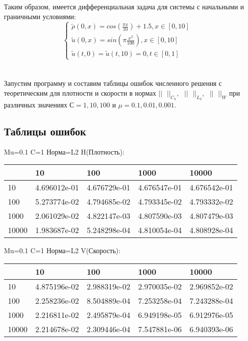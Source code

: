 \documentclass[a4paper, 12pt]{article}
\begin{document}
Таким образом,  имеется дифференциальная задача для системы с начальными и граничными условиями:
\begin{equation*}
 \begin{cases}
\widetilde{\rho}(0,x)=cos(\frac{\pi x}{10})+1.5, x \in [0,10]
\\
\widetilde {u}(0,x)=sin(\pi \frac{x^{2}}{100}), x \in [0,10]
\\
\widetilde {u}(t,0)=\widetilde {u}(t,10)=0, t \in [0,1]
 \end{cases}
\end{equation*}
\\ 
\\
Запустим программу и составим таблицы ошибок численного решения с теоретическим для плотности и скорости в нормах $||\text{ }||_{C_{h}},\text{ }||\text{ }||_{L_{2}},\text{ }||\text{ }||_{W}$ при  различных значениях   С$=1,10,100$ и $\mu=0.1,0.01,0.001$.
\\
\subsection{Таблицы ошибок}
Mu=0.1  C=1 Норма=L2 H(Плотность):


\begin{tabular}{lllll}
\toprule
{} &         10    &         100   &         1000  &         10000 \\
\midrule
10    &  4.696012e-01 &  4.676729e-01 &  4.676547e-01 &  4.676542e-01 \\
100   &  5.273774e-02 &  4.794685e-02 &  4.793345e-02 &  4.793332e-02 \\
1000  &  2.061029e-02 &  4.822147e-03 &  4.807590e-03 &  4.807479e-03 \\
10000 &  1.983687e-02 &  5.248298e-04 &  4.810054e-04 &  4.808928e-04 \\
\bottomrule
\end{tabular}



\bigskip
\bigskip
\bigskip


Mu=0.1  C=1 Норма=L2 V(Скорость):


\begin{tabular}{lllll}
\toprule
{} &         10    &         100   &         1000  &         10000 \\
\midrule
10    &  4.875196e-02 &  2.988319e-02 &  2.970035e-02 &  2.969852e-02 \\
100   &  2.258236e-02 &  8.504889e-04 &  7.253258e-04 &  7.243288e-04 \\
1000  &  2.216811e-02 &  2.495879e-04 &  6.949198e-05 &  6.912976e-05 \\
10000 &  2.214678e-02 &  2.309446e-04 &  7.547881e-06 &  6.940393e-06 \\
\bottomrule
\end{tabular}
\end{document}
